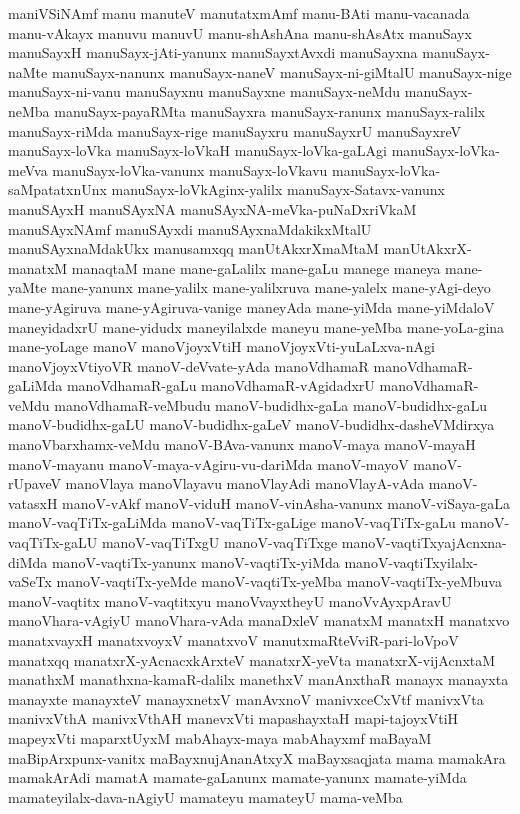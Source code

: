 {maniVSiNAmf
manu
manuteV
manutatxmAmf
manu-BAti
manu-vacanada
manu-vAkayx
manuvu
manuvU
manu-shAshAna
manu-shAsAtx
manuSayx
manuSayxH
manuSayx-jAti-yanunx
manuSayxtAvxdi
manuSayxna
manuSayx-naMte
manuSayx-nanunx
manuSayx-naneV
manuSayx-ni-giMtalU
manuSayx-nige
manuSayx-ni-vanu
manuSayxnu
manuSayxne
manuSayx-neMdu
manuSayx-neMba
manuSayx-payaRMta
manuSayxra
manuSayx-ranunx
manuSayx-ralilx
manuSayx-riMda
manuSayx-rige
manuSayxru
manuSayxrU
manuSayxreV
manuSayx-loVka
manuSayx-loVkaH
manuSayx-loVka-gaLAgi
manuSayx-loVka-meVva
manuSayx-loVka-vanunx
manuSayx-loVkavu
manuSayx-loVka-saMpatatxnUnx
manuSayx-loVkAginx-yalilx
manuSayx-Satavx-vanunx
manuSAyxH
manuSAyxNA
manuSAyxNA-meVka-puNaDxriVkaM
manuSAyxNAmf
manuSAyxdi
manuSAyxnaMdakikxMtalU
manuSAyxnaMdakUkx
manusamxqq
manUtAkxrXmaMtaM
manUtAkxrX-manatxM
manaqtaM
mane
mane-gaLalilx
mane-gaLu
manege
maneya
mane-yaMte
mane-yanunx
mane-yalilx
mane-yalilxruva
mane-yalelx
mane-yAgi-deyo
mane-yAgiruva
mane-yAgiruva-vanige
maneyAda
mane-yiMda
mane-yiMdaloV
maneyidadxrU
mane-yidudx
maneyilalxde
maneyu
mane-yeMba
mane-yoLa-gina
mane-yoLage
manoV
manoVjoyxVtiH
manoVjoyxVti-yuLaLxva-nAgi
manoVjoyxVtiyoVR
manoV-deVvate-yAda
manoVdhamaR
manoVdhamaR-gaLiMda
manoVdhamaR-gaLu
manoVdhamaR-vAgidadxrU
manoVdhamaR-veMdu
manoVdhamaR-veMbudu
manoV-budidhx-gaLa
manoV-budidhx-gaLu
manoV-budidhx-gaLU
manoV-budidhx-gaLeV
manoV-budidhx-dasheVMdirxya
manoVbarxhamx-veMdu
manoV-BAva-vanunx
manoV-maya
manoV-mayaH
manoV-mayanu
manoV-maya-vAgiru-vu-dariMda
manoV-mayoV
manoV-rUpaveV
manoVlaya
manoVlayavu
manoVlayAdi
manoVlayA-vAda
manoV-vatasxH
manoV-vAkf
manoV-viduH
manoV-vinAsha-vanunx
manoV-viSaya-gaLa
manoV-vaqTiTx-gaLiMda
manoV-vaqTiTx-gaLige
manoV-vaqTiTx-gaLu
manoV-vaqTiTx-gaLU
manoV-vaqTiTxgU
manoV-vaqTiTxge
manoV-vaqtiTxyajAcnxna-diMda
manoV-vaqtiTx-yanunx
manoV-vaqtiTx-yiMda
manoV-vaqtiTxyilalx-vaSeTx
manoV-vaqtiTx-yeMde
manoV-vaqtiTx-yeMba
manoV-vaqtiTx-yeMbuva
manoV-vaqtitx
manoV-vaqtitxyu
manoVvayxtheyU
manoVvAyxpAravU
manoVhara-vAgiyU
manoVhara-vAda
manaDxleV
manatxM
manatxH
manatxvo
manatxvayxH
manatxvoyxV
manatxvoV
manutxmaRteVviR-pari-loVpoV
manatxqq
manatxrX-yAcnacxkArxteV
manatxrX-yeVta
manatxrX-vijAcnxtaM
manathxM
manathxna-kamaR-dalilx
manethxV
manAnxthaR
manayx
manayxta
manayxte
manayxteV
manayxnetxV
manAvxnoV
manivxceCxVtf
manivxVta
manivxVthA
manivxVthAH
manevxVti
mapashayxtaH
mapi-tajoyxVtiH
mapeyxVti
maparxtUyxM
mabAhayx-maya
mabAhayxmf
maBayaM
maBipArxpunx-vanitx
maBayxnujAnanAtxyX
maBayxsaqjata
mama
mamakAra
mamakArAdi
mamatA
mamate-gaLanunx
mamate-yanunx
mamate-yiMda
mamateyilalx-dava-nAgiyU
mamateyu
mamateyU
mama-veMba
}
